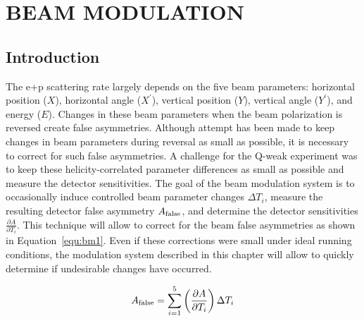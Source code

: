 \chapter{BEAM MODULATION}
\label{BEAM MODULATION}

\section{Introduction}
\label{IntroductionBMod}

The e+p scattering rate largely depends on the five beam parameters: horizontal position ($X$), horizontal angle ($X^{\prime}$), vertical position ($Y$), vertical angle ($Y^{\prime}$), and energy ($E$). Changes in these beam parameters when the beam polarization is reversed create false asymmetries. Although attempt has been made to keep changes in beam parameters during reversal as small as possible, it is necessary to correct for such false asymmetries. A challenge for the Q-weak experiment was to keep these helicity-correlated parameter differences as small as possible and measure the detector sensitivities. The goal of the beam modulation system is to occasionally induce controlled beam parameter changes $\Delta T_{i}$, measure the resulting detector false asymmetry $A_{\rm false}$, and determine the detector sensitivities $\displaystyle\frac{\partial A}{\partial T_{i}}$. This technique will allow to correct for the beam false asymmetries as shown in Equation~\ref{equ:bm1}. Even if these corrections were small under ideal running conditions, the modulation system described in this chapter will allow to quickly determine if undesirable changes have occurred. 

\begin{equation} \label{equ:bm1}
A_{\rm false} = \sum^{5}_{i=1} \left(\frac{\partial A }{ \partial T_{i} }\right) \Delta T_{i}
\end{equation}

